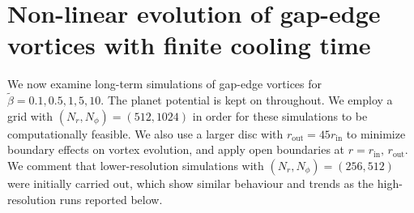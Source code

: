 
\section{Non-linear evolution of
  gap-edge vortices with finite cooling time}\label{nonlinear} 

We now examine long-term simulations of gap-edge vortices for
$\tilde{\beta}=0.1,0.5,1,5,10$. The planet potential is kept on
throughout.  
We employ a grid with $(N_r,N_{\phi})=(512,1024)$ in order for these
simulations to be computationally feasible. We also use a larger
disc with $r_{\mathrm{out}}=45r_{\mathrm{in}}$ to minimize boundary
effects on vortex evolution, and apply open boundaries at
$r=r_\mathrm{in},\,r_\mathrm{out}$. We comment that lower-resolution
simulations with $(N_r,N_{\phi})=(256,512)$ were initially carried
out, which show similar behaviour and trends as the high-resolution
runs reported below.  



